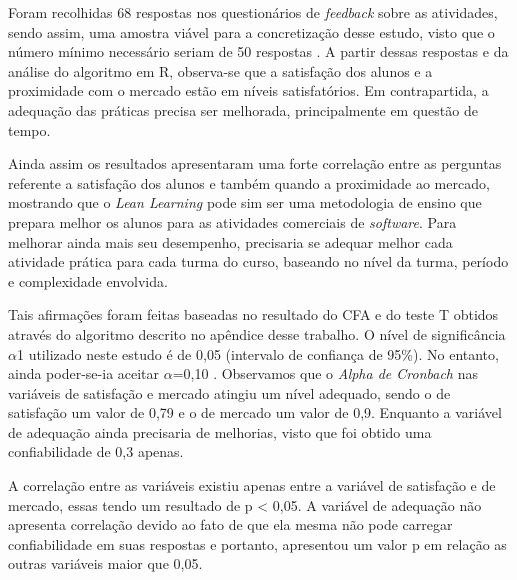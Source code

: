 Foram recolhidas 68 respostas nos questionários de \textit{feedback} sobre as atividades, sendo assim, uma amostra viável para a concretização desse estudo, visto que o número mínimo necessário seriam de 50 respostas \cite{hair2009analise}. A partir dessas respostas e da análise do algoritmo em R, observa-se que a satisfação dos alunos e a proximidade com o mercado estão em níveis satisfatórios. Em contrapartida, a adequação das práticas precisa ser melhorada, principalmente em questão de tempo. %

Ainda assim os resultados apresentaram uma forte correlação entre as perguntas referente a satisfação dos alunos e também quando a proximidade ao mercado, mostrando que o \textit{Lean Learning} pode sim ser uma metodologia de ensino que prepara melhor os alunos para as atividades comerciais de \textit{software}. Para melhorar ainda mais seu desempenho, precisaria se adequar melhor cada atividade prática para cada turma do curso, baseando no nível da turma, período e complexidade envolvida.

Tais afirmações foram feitas baseadas no resultado do CFA e do teste T obtidos através do algoritmo descrito no apêndice desse trabalho. O nível de significância $\alpha$1 utilizado neste estudo é de 0,05 (intervalo de confiança de 95\%). No entanto, ainda poder-se-ia aceitar $\alpha$=0,10 \cite{hair2009analise}. Observamos que o \textit{Alpha de Cronbach} nas variáveis de satisfação e mercado atingiu um nível adequado, sendo o de satisfação um valor de 0,79 e o de mercado um valor de 0,9. Enquanto a variável de adequação ainda precisaria de melhorias, visto que foi obtido uma confiabilidade de 0,3 apenas.

A correlação entre as variáveis existiu apenas entre a variável de satisfação e de mercado, essas tendo um resultado de p < 0,05. A variável de adequação não apresenta correlação devido ao fato de que ela mesma não pode carregar confiabilidade em suas respostas e portanto, apresentou um valor p em relação as outras variáveis maior que 0,05.